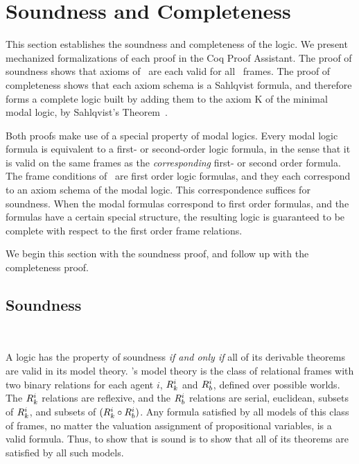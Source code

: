 


\section{Soundness and Completeness}

This section establishes the soundness and completeness of the logic.  We present mechanized formalizations of each proof in the Coq Proof Assistant. The proof of soundness shows that axioms of \DASL\ are each valid for all \DASL\ frames. The proof of completeness shows that each axiom schema is a Sahlqvist formula, and therefore forms a complete logic built by adding them to the axiom K of the minimal modal logic, by Sahlqvist's Theorem~\cite{sahlqvist}.

Both proofs make use of a special property of modal logics. Every modal logic formula is equivalent to a first- or second-order logic formula, in the sense that it is valid on the same frames as the \emph{corresponding} first- or second order formula. The frame conditions of \DASL\ are first order logic formulas, and they each correspond to an axiom schema of the modal logic. This correspondence suffices for soundness. When the modal formulas correspond to first order formulas, and the formulas have a certain special structure, the resulting logic is guaranteed to be complete with respect to the first order frame relations.

We begin this section with the soundness proof, and follow up with the completeness proof. 

\subsection{Soundness}~\label{sec:soundness}

A logic has the property of soundness \emph{if and only if} all of its derivable theorems are valid in its model theory. \DASL's model theory is the class of relational frames with two binary relations for each agent $i$, $R_{k}^i$ and $R_{b}^i$, defined over possible worlds. The $R_{k}^i$ relations are reflexive, and the $R_{b}^i$ relations are serial, euclidean, subsets of $R_{k}^i$, and subsets of $(R_{k}^i \circ R_{b}^i)$. Any formula satisfied by all models of this class of frames, no matter the valuation assignment of propositional variables, is a valid formula. Thus, to show that \DASL is sound is to show that all of its theorems are satisfied by all such models.

